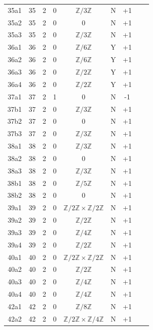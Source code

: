 \begin{longtable}{ccccccccc}
35a1 & 35 & 2 & 0 & $\mathbb{Z}/3\mathbb{Z}$ & N & +1 &  &  \\
35a2 & 35 & 2 & 0 & 0 & N & +1 &  &  \\
35a3 & 35 & 2 & 0 & $\mathbb{Z}/3\mathbb{Z}$ & N & +1 &  &  \\
36a1 & 36 & 2 & 0 & $\mathbb{Z}/6\mathbb{Z}$ & Y & +1 &  &  \\
36a2 & 36 & 2 & 0 & $\mathbb{Z}/6\mathbb{Z}$ & Y & +1 &  &  \\
36a3 & 36 & 2 & 0 & $\mathbb{Z}/2\mathbb{Z}$ & Y & +1 &  &  \\
36a4 & 36 & 2 & 0 & $\mathbb{Z}/2\mathbb{Z}$ & Y & +1 &  &  \\
37a1 & 37 & 2 & 1 & 0 & N & -1 &  &  \\
37b1 & 37 & 2 & 0 & $\mathbb{Z}/3\mathbb{Z}$ & N & +1 &  &  \\
37b2 & 37 & 2 & 0 & 0 & N & +1 &  &  \\
37b3 & 37 & 2 & 0 & $\mathbb{Z}/3\mathbb{Z}$ & N & +1 &  &  \\
38a1 & 38 & 2 & 0 & $\mathbb{Z}/3\mathbb{Z}$ & N & +1 &  &  \\
38a2 & 38 & 2 & 0 & 0 & N & +1 &  &  \\
38a3 & 38 & 2 & 0 & $\mathbb{Z}/3\mathbb{Z}$ & N & +1 &  &  \\
38b1 & 38 & 2 & 0 & $\mathbb{Z}/5\mathbb{Z}$ & N & +1 &  &  \\
38b2 & 38 & 2 & 0 & 0 & N & +1 &  &  \\
39a1 & 39 & 2 & 0 & $\mathbb{Z}/2\mathbb{Z} \times \mathbb{Z}/2\mathbb{Z}$ & N & +1 &  &  \\
39a2 & 39 & 2 & 0 & $\mathbb{Z}/2\mathbb{Z}$ & N & +1 &  &  \\
39a3 & 39 & 2 & 0 & $\mathbb{Z}/4\mathbb{Z}$ & N & +1 &  &  \\
39a4 & 39 & 2 & 0 & $\mathbb{Z}/2\mathbb{Z}$ & N & +1 &  &  \\
40a1 & 40 & 2 & 0 & $\mathbb{Z}/2\mathbb{Z} \times \mathbb{Z}/2\mathbb{Z}$ & N & +1 &  &  \\
40a2 & 40 & 2 & 0 & $\mathbb{Z}/2\mathbb{Z}$ & N & +1 &  &  \\
40a3 & 40 & 2 & 0 & $\mathbb{Z}/4\mathbb{Z}$ & N & +1 &  &  \\
40a4 & 40 & 2 & 0 & $\mathbb{Z}/4\mathbb{Z}$ & N & +1 &  &  \\
42a1 & 42 & 2 & 0 & $\mathbb{Z}/8\mathbb{Z}$ & N & +1 &  &  \\
42a2 & 42 & 2 & 0 & $\mathbb{Z}/2\mathbb{Z} \times \mathbb{Z}/4\mathbb{Z}$ & N & +1 &  &  \\

\end{longtable}
